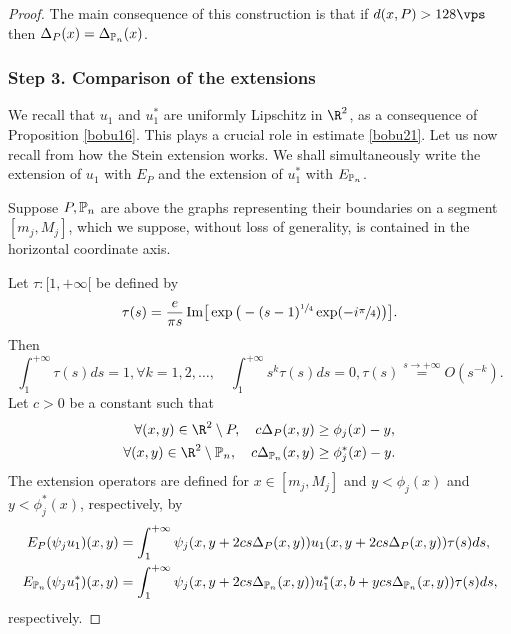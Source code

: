 \begin{proof}
The main consequence of this construction is that if $d(x, P) > 128 \vps$ then $\Delta_P(x) =\Delta_{\Bbb P_n}(x)$.

\subsubsection*{Step 3. Comparison of the extensions} We recall that $u_1$ and $u_1^*$ are uniformly Lipschitz in $\R^2$, as a consequence of Proposition \ref{bobu16}. This plays a crucial role in estimate \eqref{bobu21}. Let us now recall from \cite{St70} how the Stein extension works. We shall simultaneously write the extension of $u_1$ with $E_P$ and the extension of $u_1^*$ with $E_{\Bbb P_n}$.

Suppose $P, \Bbb P_n$ are above the graphs representing their boundaries on a segment $[m_j,M_j]$, which we suppose, without loss of generality, is contained in the horizontal coordinate axis.

Let $\tau :[1, +\infty[$ be defined by
\[
\tau (s)= \frac{e}{\pi s}\, \text{Im} \big [ \exp \big (-(s-1)^{\sfrac 14} \exp (-i \sfrac{\pi}{4})\big) \big ].
\]
Then
\[
\int_1^{+\infty} \tau (s) ds =1, \forall k=1, 2,\dots,\quad \int_1^{+\infty} s^k \tau (s) ds =0, \tau (s) \stackrel{s \rightarrow +\infty}{=} O(s^{-k}).
\]
Let $c>0$ be a constant such that
\begin{align*}
\forall (x,y) \in \R^2 \setminus P, \quad c \Delta_P (x,y) &\ge \phi_j (x) -y,
\\
\forall (x,y) \in \R^2 \setminus \Bbb P_n, \quad c \Delta_{\Bbb P_n} (x,y) &\ge \phi^*_j (x) -y.
\end{align*}
The extension operators are defined for $x \in [m_j,M_j]$ and $ y <\phi_j (x)$ and $ y < \phi_j^*(x)$, respectively, by
\begin{align*}
E_P(\psi_j u_1)(x,y)&= \int_1^{+\infty} \psi_j(x, y+2 cs \Delta_P(x,y)) u_1(x, y+2 cs \Delta_P(x,y))\tau (s) ds,
\\
E_{\Bbb P_n}(\psi_j u^*_1)(x,y)&= \int_1^{+\infty} \psi_j (x, y+2 cs \Delta_{\Bbb P_n}(x,y)) u_1^*(x, b+y cs \Delta_{\Bbb P_n}(x,y))\tau (s) ds,
\end{align*}
respectively.


\end{proof}
